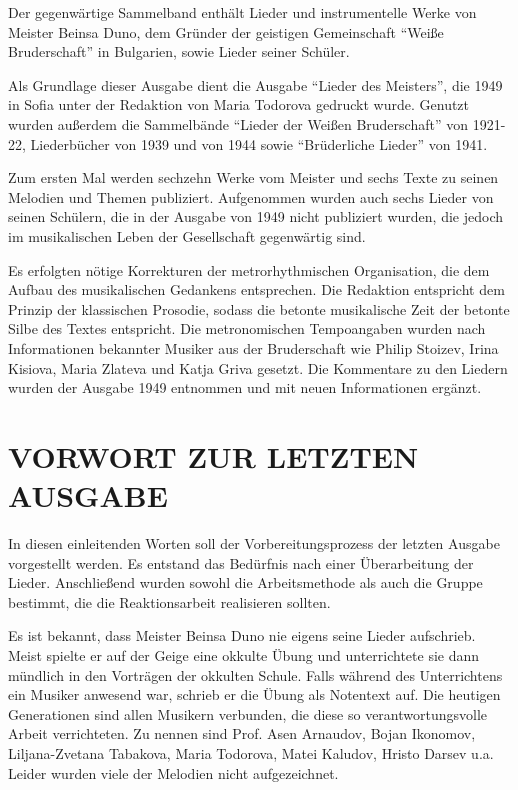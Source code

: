 \documentclass[11pt,a5paper,twoside]{article}
\begin{document}
Der gegenwärtige Sammelband enthält Lieder und instrumentelle Werke von Meister Beinsa Duno, dem Gründer der geistigen Gemeinschaft "`Weiße Bruderschaft"' in Bulgarien, sowie Lieder seiner Schüler. 

Als Grundlage dieser Ausgabe dient die Ausgabe "`Lieder des Meisters"', die 1949 in Sofia unter der Redaktion von Maria Todorova gedruckt wurde. Genutzt wurden außerdem die Sammelbände "`Lieder der Weißen Bruderschaft"' von 1921-22, Liederbücher von 1939 und von 1944 sowie "`Brüderliche Lieder"' von 1941. 

Zum ersten Mal werden sechzehn Werke vom Meister und sechs Texte zu seinen Melodien und Themen publiziert. Aufgenommen wurden auch sechs Lieder von seinen Schülern, die in der Ausgabe von 1949 nicht publiziert wurden, die jedoch im musikalischen Leben der Gesellschaft gegenwärtig sind.

Es erfolgten nötige Korrekturen der metrorhythmischen Organisation, die dem Aufbau des musikalischen Gedankens entsprechen. Die Redaktion entspricht dem Prinzip der klassischen Prosodie, sodass die betonte musikalische Zeit der betonte Silbe des Textes entspricht. Die metronomischen Tempoangaben wurden nach Informationen bekannter Musiker aus der Bruderschaft wie Philip Stoizev, Irina Kisiova, Maria Zlateva und Katja Griva gesetzt. Die Kommentare zu den Liedern wurden der Ausgabe 1949 entnommen und mit neuen Informationen ergänzt. 



\section[Vorwort zur letzten Ausgabe]{VORWORT ZUR LETZTEN AUSGABE}

In diesen einleitenden Worten soll der Vorbereitungsprozess der letzten Ausgabe vorgestellt werden. Es entstand das Bedürfnis nach einer Überarbeitung der Lieder. Anschließend wurden sowohl die Arbeitsmethode als auch die Gruppe bestimmt, die die Reaktionsarbeit realisieren sollten.

Es ist bekannt, dass Meister Beinsa Duno nie eigens seine Lieder aufschrieb. Meist spielte er auf der Geige eine okkulte Übung und unterrichtete sie dann mündlich in den Vorträgen der okkulten Schule. Falls während des Unterrichtens ein Musiker anwesend war, schrieb er die Übung als Notentext auf. Die heutigen Generationen sind allen Musikern verbunden, die diese so verantwortungsvolle Arbeit verrichteten. Zu nennen sind Prof. Asen Arnaudov, Bojan Ikonomov, Liljana-Zvetana Tabakova, Maria Todorova, Matei Kaludov, Hristo Darsev u.a. Leider wurden viele der Melodien nicht aufgezeichnet. 
\end{document}
